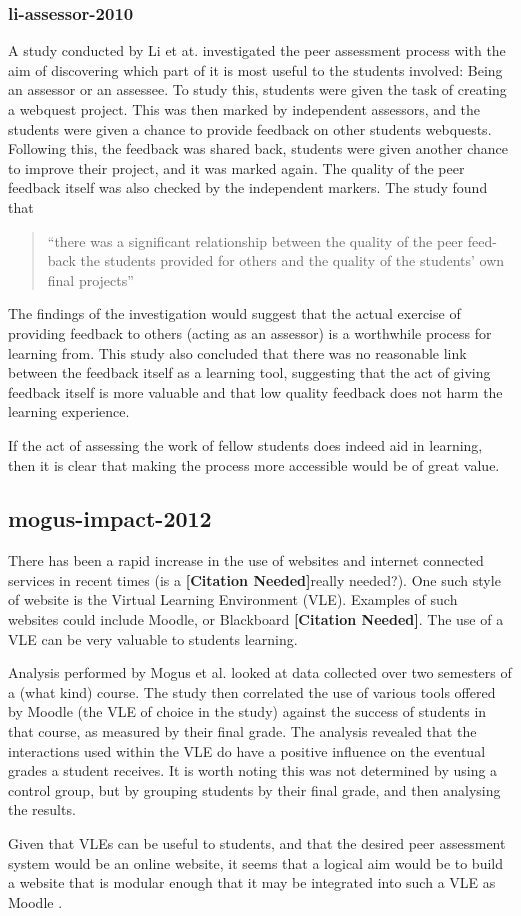 \documentclass[a4paper,11pt]{report}
\newcommand{\cn}{\textbf{[Citation Needed]}}
\begin{document}
\subsubsection{li-assessor-2010}
A study conducted by Li et at. \cite{li_assessor_2010} investigated the peer assessment process with the aim of discovering which part of it is most useful to the students involved: Being an assessor or an assessee. To study this, students were given the task of creating a webquest project. This was then marked by independent assessors, and the students were given a chance to provide feedback on other students webquests. Following this, the feedback was shared back, students were given another chance to improve their project, and it was marked again. The quality of the peer feedback itself was also checked by the independent markers. The study found that 
\begin{quote}
``there was a significant relationship between the quality of the peer feed-back the students provided for others and the quality of the students’ own final projects''
\end{quote}
The findings of the investigation would suggest that the actual exercise of providing feedback to others (acting as an assessor) is a worthwhile process for learning from. This study also concluded that there was no reasonable link between the feedback itself as a learning tool, suggesting that the act of giving feedback itself is more valuable and that low quality feedback does not harm the learning experience.\par
If the act of assessing the work of fellow students does indeed aid in learning, then it is clear that making the process more accessible would be of great value.

\subsection{mogus-impact-2012}
There has been a rapid increase in the use of websites and internet connected services in recent times (is a \cn really needed?). One such style of website is the Virtual Learning Environment (VLE). Examples of such websites could include Moodle, \cite{mooble_about_2016} or Blackboard \cn. The use of a VLE can be very valuable to students learning.\par
Analysis performed by Mogus et al. \cite{mogus_impact_2012} looked at data collected over two semesters of a (what kind) course. The study then correlated the use of various tools offered by Moodle (the VLE of choice in the study) against the success of students in that course, as measured by their final grade. The analysis 
revealed that the interactions used within the VLE do have a positive influence on the eventual grades a student receives. It is worth noting this was not determined by using a control group, but by grouping students by their final grade, and then analysing the results.\par
Given that VLEs can be useful to students, and that the desired peer assessment system would be an online website, it seems that a logical aim would be to build a website that is modular enough that it may be integrated into such a VLE as Moodle \cite{moodle_about_2016}.
\end{document}
